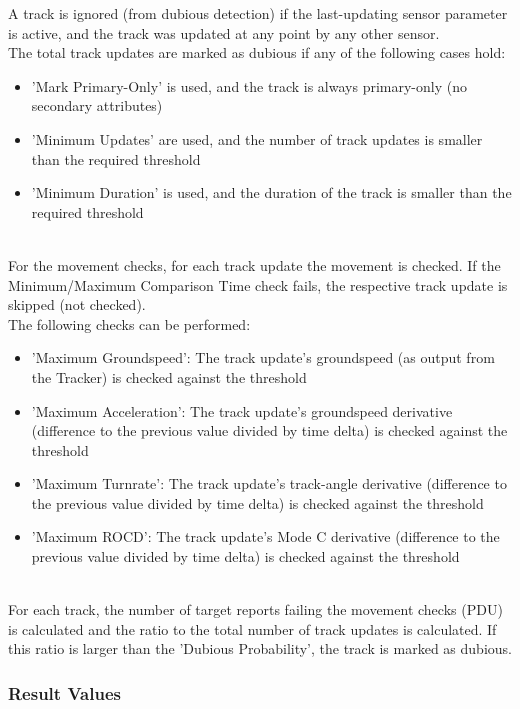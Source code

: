 A track is ignored (from dubious detection) if the last-updating sensor parameter is active, and the track was updated at any point by any other sensor. \\

The total track updates are marked as dubious if any of the following cases hold:
\begin{itemize}  
\item 'Mark Primary-Only' is used, and the track is always primary-only (no secondary attributes)
\item 'Minimum Updates' are used, and the number of track updates is smaller than the required threshold
\item 'Minimum Duration' is used, and the duration of the track is smaller than the required threshold
\end{itemize}
\ \\

For the movement checks, for each track update the movement is checked. If the Minimum/Maximum Comparison Time check fails, the respective track update is skipped (not checked). \\ 

The following checks can be performed:
\begin{itemize}  
\item 'Maximum Groundspeed': The track update's groundspeed (as output from the Tracker) is checked against the threshold
\item 'Maximum Acceleration': The track update's groundspeed derivative (difference to the previous value divided by time delta) is checked against the threshold
\item 'Maximum Turnrate': The track update's track-angle derivative (difference to the previous value divided by time delta) is checked against the threshold
\item 'Maximum ROCD': The track update's Mode C derivative (difference to the previous value divided by time delta) is checked against the threshold
\end{itemize}
\ \\

For each track, the number of target reports failing the movement checks (PDU) is calculated and the ratio to the total number of track updates is calculated. If this ratio is larger than the 'Dubious Probability', the track is marked as dubious.

\subsubsection{Result Values}

